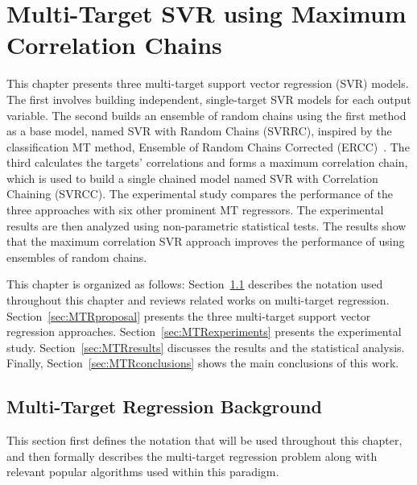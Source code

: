 \documentclass[reqno]{vcuthesis}
\numberwithin{equation}{chapter}
\begin{document}
\chapter{Multi-Target SVR using Maximum Correlation Chains}\label{chap:mtr}
This chapter presents three multi-target support vector regression (SVR) models. The first involves building independent, single-target SVR models for each output variable. The second builds an ensemble of random chains using the first method as a base model, named SVR with Random Chains (SVRRC), inspired by the classification MT method, Ensemble of Random Chains Corrected (ERCC)~\cite{Spyromitros2014}. The third calculates the targets' correlations and forms a maximum correlation chain, which is used to build a single chained model named SVR with Correlation Chaining (SVRCC). The experimental study compares the performance of the three approaches with six other prominent MT regressors. The experimental results are then analyzed using non-parametric statistical tests. The results show that the maximum correlation SVR approach improves the performance of using ensembles of random chains. 

This chapter is organized as follows: Section~\ref{sec:MTRbackground} describes the notation used throughout this chapter and reviews related works on multi-target regression. Section~\ref{sec:MTRproposal} presents the three multi-target support vector regression approaches. Section~\ref{sec:MTRexperiments} presents the experimental study. Section~\ref{sec:MTRresults} discusses the results and the statistical analysis. Finally, Section~\ref{sec:MTRconclusions} shows the main conclusions of this work.

\section{Multi-Target Regression Background}\label{sec:MTRbackground}
This section first defines the notation that will be used throughout this chapter, and then formally describes the multi-target regression problem along with relevant popular algorithms used within this paradigm.
\end{document}
